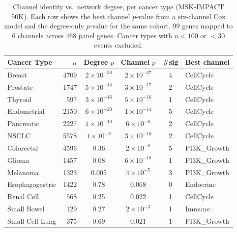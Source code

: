 \documentclass[11pt]{article}
\begin{document}
\begin{table}[ht]
\centering
\caption{Channel identity vs.\ network degree, per cancer type
(MSK-IMPACT 50K). Each row shows the best channel $p$-value from a
six-channel Cox model and the degree-only $p$-value for the same
cohort. 99 genes mapped to 6 channels across 468 panel genes.
Cancer types with $n < 100$ or $<30$ events excluded.}
\label{tab:degree-vs-channel}
\medskip
\small
\begin{tabular*}{\textwidth}{@{\extracolsep{\fill}}lrcccl@{}}
\toprule
Cancer Type & $n$ & Degree $p$ & Channel $p$ & \#sig & Best channel \\
\midrule
Breast                    & 4709 & $2 \times 10^{-30}$ & $2 \times 10^{-37}$ & 4 & CellCycle \\
Prostate                  & 1747 & $5 \times 10^{-14}$ & $3 \times 10^{-17}$ & 2 & CellCycle \\
Thyroid                   &  597 & $3 \times 10^{-16}$ & $5 \times 10^{-16}$ & 1 & CellCycle \\
Endometrial               & 2150 & $6 \times 10^{-20}$ & $1 \times 10^{-14}$ & 5 & CellCycle \\
Pancreatic                & 2227 & $1 \times 10^{-10}$ & $6 \times 10^{-6}$  & 2 & CellCycle \\
NSCLC                     & 5578 & $1 \times 10^{-9}$  & $3 \times 10^{-10}$ & 2 & CellCycle \\
\midrule
Colorectal                & 4596 & 0.36                & $2 \times 10^{-8}$  & 5 & PI3K\_Growth \\
Glioma                    & 1457 & 0.08                & $6 \times 10^{-18}$ & 1 & PI3K\_Growth \\
Melanoma                  & 1323 & 0.005               & $4 \times 10^{-5}$  & 3 & PI3K\_Growth \\
Esophagogastric           & 1422 & 0.78                & 0.068               & 0 & Endocrine \\
Renal Cell                &  568 & 0.25                & 0.022               & 1 & CellCycle \\
Small Bowel               &  129 & 0.27                & $2 \times 10^{-3}$  & 1 & Immune \\
Small Cell Lung           &  375 & 0.69                & 0.021               & 1 & PI3K\_Growth \\
\bottomrule
\end{tabular*}
\end{table}
\end{document}
